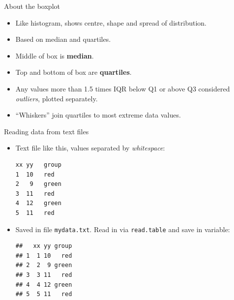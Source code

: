\begin{frame}[fragile]{About the boxplot}
  
  \begin{itemize}
  \item Like histogram, shows centre, shape and spread of distribution.
  \item Based on median and quartiles.
  \item Middle of box is \textbf{median}.
  \item Top and bottom of  box are \textbf{quartiles}.
  \item Any values more than 1.5 times IQR below Q1 or above Q3
    considered \emph{outliers}, plotted separately.
  \item ``Whiskers'' join quartiles to most extreme data values.
  \end{itemize}
  
\end{frame}

\begin{frame}[fragile]{Reading data from text files}
  
  \begin{itemize}
  \item Text file like this, values separated by \emph{whitespace}:
\begin{verbatim}
xx yy   group
1  10   red
2   9   green
3  11   red
4  12   green
5  11   red
\end{verbatim}
  \item Saved in file \texttt{mydata.txt}. Read in via
    \texttt{read.table} and save in variable:
 
\begin{knitrout}
\color{fgcolor}\begin{kframe}
\begin{alltt}
\hlkwb{=}\hlstd{(}\hlstd{,}
\end{alltt}
\begin{verbatim}
##   xx yy group
## 1  1 10   red
## 2  2  9 green
## 3  3 11   red
## 4  4 12 green
## 5  5 11   red
\end{verbatim}
\end{kframe}
\end{knitrout}
    
  \end{itemize}
  
\end{frame}

